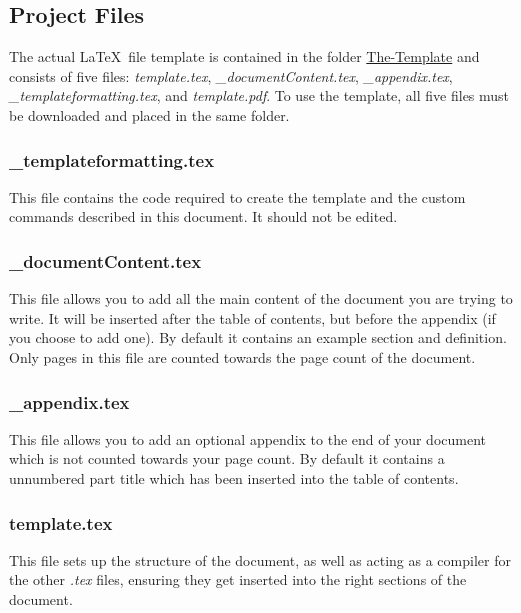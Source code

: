 \subsection{Project Files}

The actual \LaTeX\ file template is contained in the folder \href{https://github.com/MatthewEmer/LaTeX-File-Template/tree/main/The-Template}{The-Template} and consists of five files: \textit{template.tex}, \textit{\_documentContent.tex}, \textit{\_appendix.tex}, \textit{\_templateformatting.tex}, and \textit{template.pdf}. To use the template, all five files must be downloaded and placed in the same folder. 

\subsubsection{\_templateformatting.tex}

This file contains the code required to create the template and the custom commands described in this document. It should not be edited.

\subsubsection{\_documentContent.tex}

This file allows you to add all the main content of the document you are trying to write. It will be inserted after the table of contents, but before the appendix (if you choose to add one). By default it contains an example section and definition. Only pages in this file are counted towards the page count of the document.

\subsubsection{\_appendix.tex}

This file allows you to add an optional appendix to the end of your document which is not counted towards your page count. By default it contains a unnumbered part title which has been inserted into the table of contents.  

\subsubsection{template.tex}

This file sets up the structure of the document, as well as acting as a compiler for the other \textit{.tex} files, ensuring they get inserted into the right sections of the document.


